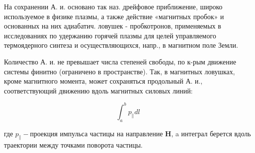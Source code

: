 \documentclass[10pt]{article}
\begin{document}
На сохранении А. и. основано так наз. дрейфовое приближение, широко используемое в физике плазмы, а также действие «магнитных пробок» и основанных на них адиабатич. ловушек - пробкотронов, применяемых в исследованиях по удержанию горячей плазмы для целей управляемого термоядерного синтеза и осуществляющихся, напр., в магнитном поле Земли.



Количество А. и. не превышает числа степеней свободы, по к-рым движение системы финитно (ограничено в пространстве). Так, в магнитных ловушках, кроме магнитного момента, может сохраняться продольный А. и., соответствующий движению вдоль магнитных силовых линий:



\[

\int_{a}^{b} p_{\|} d l

\]



где $p_{\|}-$проекция импульса частицы на направление $\boldsymbol{H}$, a интеграл берется вдоль траектории между точками поворота частицы.
\end{document}
